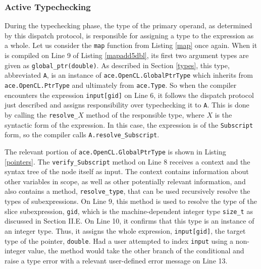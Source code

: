 \documentclass[10pt]{sigplanconf}
\begin{document}
\subsubsection{Active Typechecking}
During the typechecking phase, the type of the primary operand, as determined by this dispatch protocol, is responsible for assigning a type to the expression as a whole. Let us consider the \verb|map| function from Listing \ref{map} once again. When it is compiled on Line 9 of Listing \ref{mapadd5dbl}, its first two argument types are given as \verb|global_ptr(double)|. As described in Section \ref{types}, this type, abbreviated \verb|A|, is an instance of \verb|ace.OpenCL.GlobalPtrType| which inherits from \verb|ace.OpenCL.PtrType| and ultimately from \verb|ace.Type|. So when the compiler encounters the expression \verb|input[gid]| on Line 6, it follows the dispatch protocol just described and assigns responsibility over typechecking it to \verb|A|. This is done by calling the \verb|resolve_|$X$ method of the responsible type, where $X$ is the syntactic form of the expression. In this case, the expression is of the \verb|Subscript| form, so the compiler calls \verb|A.resolve_Subscript|.

The relevant portion of \verb|ace.OpenCL.GlobalPtrType| is shown in Listing \ref{pointers}. The \verb|verify_Subscript| method on Line 8 receives a context and the syntax tree of the node itself as input. The context contains information about other variables in scope, as well as other potentially relevant information, and also contains a method, \verb|resolve_type|, that can be used recursively resolve the types of subexpressions. On Line 9, this method is used to resolve the type of the slice subexpression, \verb|gid|, which is the machine-dependent integer type \verb|size_t| as discussed in Section II.E. On Line 10, it confirms that this type is an instance of an integer type. Thus, it assigns the whole expression, \verb|input[gid]|, the target type of the pointer, \verb|double|. Had a user attempted to index \verb|input| using a non-integer value, the method would take the other branch of the conditional and raise a type error with a relevant user-defined error message on Line 13.
\end{document}
